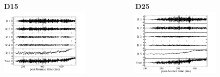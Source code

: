 \documentclass[aspectratio=169]{beamer}
\begin{document}
\begin{frame}

  \begin{columns}[c]

      \begin{figure}
        \textbf{D15}
        \includegraphics[width=1.0\textwidth]{Figures/D15_strain_byRegions.pdf}
      \end{figure}

      \begin{figure}
        \textbf{D25}
        \includegraphics[width=1.0\textwidth]{Figures/D25_strain_byRegions.pdf}
      \end{figure}

  \end{columns}

\end{frame}
\end{document}
